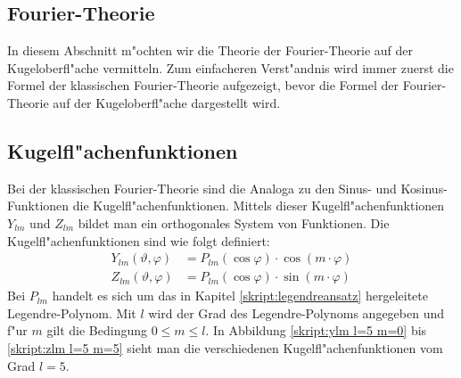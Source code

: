 \begin{refsection}
\section{Fourier-Theorie}
In diesem Abschnitt m"ochten wir die Theorie der Fourier-Theorie
auf der Kugeloberfl"ache vermitteln. 
Zum einfacheren Verst"andnis wird immer zuerst die Formel der 
klassischen Fourier-Theorie aufgezeigt, bevor die Formel der 
Fourier-Theorie auf der Kugeloberfl"ache dargestellt wird.

\subsection{Kugelfl"achenfunktionen}
Bei der klassischen Fourier-Theorie sind die Analoga zu den Sinus- 
und Kosinus-Funktionen die Kugelfl"achenfunktionen. 
Mittels dieser Kugelfl"achenfunktionen $Y_{lm}$ und $Z_{lm}$ 
bildet man ein orthogonales System von Funktionen. 
Die Kugelfl"achenfunktionen sind wie folgt definiert:
\begin{align*}
Y_{lm}(\vartheta, \varphi)& = P_{lm} (\cos \varphi) \cdot \cos(m \cdot \varphi)
\\
Z_{lm}(\vartheta, \varphi)& = P_{lm} (\cos \varphi) \cdot \sin(m \cdot \varphi)
\end{align*}
Bei $P_{lm}$ handelt es sich um das in Kapitel \ref{skript:legendreansatz} 
hergeleitete Legendre-Polynom. 
Mit $l$ wird der Grad des Legendre-Polynoms angegeben und f"ur $m$
gilt die Bedingung $0 \leq m \leq l$.  
In Abbildung \ref{skript:ylm l=5 m=0} bis \ref{skript:zlm l=5 m=5} sieht man die verschiedenen 
Kugelfl"achenfunktionen vom Grad $l = 5$.


\end{refsection}
